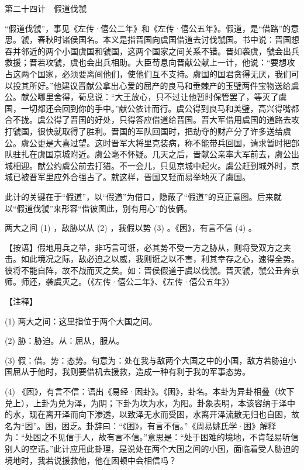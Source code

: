 \documentclass[12pt,UTF8]{ctexbook}
\begin{document}
第二十四计　假道伐虢


“假道伐虢”，事见《左传·僖公二年》和《左传·僖公五年》。假道，是“借路”的意思。虢，春秋时诸侯国名。本义是指晋国向虞国借道去讨伐虢国。书中说：晋国想吞并邻近的两个小国虞国和虢国，这两个国家之间关系不错。晋如袭虞，虢会出兵救援；晋若攻虢，虞也会出兵相助。大臣荀息向晋献公献上一计，他说：“要想攻占这两个国家，必须要离间他们，使他们互不支持。虞国的国君贪得无厌，我们可以投其所好。”他建议晋献公拿出心爱的屈产的良马和垂棘产的玉璧两件宝物送给虞公。献公哪里舍得，荀息说：“大王放心，只不过让他暂时保管罢了，等灭了虞国，一切都还会回到你的手中。”献公依计而行。虞公得到良马和美璧，高兴得嘴都合不拢。虞公得了晋国的好处，只得答应借道给晋国。晋大军借用虞国的道路去攻打虢国，很快就取得了胜利。晋国的军队回国时，把劫夺的财产分了许多送给虞公。虞公更是大喜过望。这时晋军大将里克装病，称不能带兵回国，请求暂时把部队驻扎在虞国京城附近。虞公毫不怀疑。几天之后，晋献公亲率大军前去，虞公出城相迎。献公约虞公前去打猎。不一会儿，只见京城中起火。虞公赶到城外时，京城已被晋军里应外合强占了。就这样，晋国又轻而易举地灭了虞国。

此计的关键在于“假道”，以“假道”为借口，隐蔽了“假道”的真正意图。后来就以“假道伐虢”来形容“借彼图此，别有用心”的伎俩。





两大之间 (1) ，敌胁以从 (2) ，我假以势 (3) 。《困》，有言不信 (4) 。

【按语】假地用兵之举，非巧言可诳，必其势不受一方之胁从，则将受双方之夹击。如此境况之际，敌必迫之以威，我则诳之以不害，利其幸存之心，速得全势。彼将不能自阵，故不战而灭之矣。如：晋侯假道于虞以伐虢。晋灭虢，虢公丑奔京师。师还，袭虞灭之。（《左传·僖公二年》、《左传·僖公五年》）





【注释】


(1) 两大之间：这里指位于两个大国之间。

(2) 胁：胁迫。从：屈从，服从。

(3) 假：借。势：态势。句意为：处在我与敌两个大国之中的小国，敌方若胁迫小国屈从于他时，我则要借机去援救，造成一种有利于我的军事态势。

(4) 《困》，有言不信：语出《易经·困卦》。《困》，卦名。本卦为异卦相叠（坎下兑上），上卦为兑为泽，为阴；下卦为坎为水，为阳。卦象表明，本该容纳于泽中的水，现在离开泽而向下渗透，以致泽无水而受困，水离开泽流散无归也自困，故名为“困”。困，困乏。卦辞曰：“《困》，有言不信。”《周易姚氏学·困》解释为：“处困之不见信于人，故有言不信。”意思是：“处于困难的境地，不肯轻易听信别人的空话。”此计应用此卦理，是说处在两个大国之间的小国，面临着受人胁迫的境地时，我若说援救他，他在困顿中会相信吗？
\end{document}
